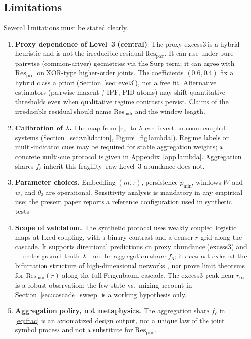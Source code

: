 \documentclass[11pt,a4paper]{article}
\begin{document}
\subsection{Limitations}

Several limitations must be stated clearly.

\begin{enumerate}[leftmargin=*,itemsep=2pt]
  \item \textbf{Proxy dependence of Level~3 (central).}
  The proxy excess3 is a hybrid heuristic and is not the irreducible
  residual $\mathrm{Res}_{\mathrm{pair}}$. It can rise under pure pairwise
  (common-driver) geometries via the Surp term; it can agree with
  $\mathrm{Res}_{\mathrm{pair}}$ on XOR-type higher-order joints. The
  coefficients $(0.6,0.4)$ fix a hybrid class a priori
  (Section~\ref{sec:level3}), not a free fit. Alternative estimators
  (pairwise maxent / IPF, PID atoms) may shift quantitative thresholds
  even when qualitative regime contrasts persist. Claims of the
  irreducible residual should name $\mathrm{Res}_{\mathrm{pair}}$ and the
  window length.

  \item \textbf{Calibration of $\lambda$.}
  The map from $|\tau_s|$ to $\lambda$ can invert on some coupled
  systems (Section~\ref{sec:validation}, Figure~\ref{fig:lambda}).
  Regime labels or multi-indicator cues may be required for stable
  aggregation weights; a concrete multi-cue protocol is given in
  Appendix~\ref{app:lambda}. Aggregation shares $f_\ell$ inherit this
  fragility; raw Level~3 abundance does not.

  \item \textbf{Parameter choices.}
  Embedding $(m,\tau)$, persistence $p_{\min}$, windows $W$ and $w$,
  and $\theta_3$ are operational. Sensitivity analysis is mandatory in
  any empirical use; the present paper reports a reference configuration
  used in synthetic tests.

  \item \textbf{Scope of validation.}
  The synthetic protocol uses weakly coupled logistic maps at fixed
  coupling, with a binary contrast and a denser $r$-grid along the
  cascade. It supports directional predictions on proxy abundance
  (excess3) and---under ground-truth $\lambda$---on the aggregation
  share $f_3$; it does not exhaust the bifurcation structure of
  high-dimensional networks \cite{Strogatz2001}, nor prove limit
  theorems for $\mathrm{Res}_{\mathrm{pair}}(r)$ along the full Feigenbaum
  cascade. The excess3 peak near $r_\infty$ is a robust observation; the
  few-state vs.\ mixing account in Section~\ref{sec:cascade_sweep} is a
  working hypothesis only.

  \item \textbf{Aggregation policy, not metaphysics.}
  The aggregation share $f_\ell$ in \eqref{eq:frac} is an axiomatized
  design output, not a unique law of the joint symbol process and not a
  substitute for $\mathrm{Res}_{\mathrm{pair}}$.
\end{enumerate}
\end{document}
